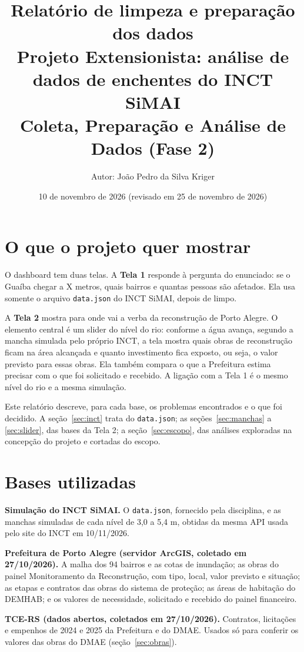 \documentclass[11pt,a4paper]{article}
\title{\textbf{Relatório de limpeza e preparação dos dados}\\[0.3em]\large Projeto Extensionista: análise de dados de enchentes do INCT SiMAI\\Coleta, Preparação e Análise de Dados (Fase 2)}
\author{Autor: João Pedro da Silva Kriger}
\date{10 de novembro de 2026 (revisado em 25 de novembro de 2026)}
\newcommand{\campo}[1]{\texttt{#1}}
\begin{document}
\maketitle

\section{O que o projeto quer mostrar}

O dashboard tem duas telas. A \textbf{Tela 1} responde à pergunta do enunciado: se o Guaíba chegar a X metros, quais bairros e quantas pessoas são afetados. Ela usa somente o arquivo \campo{data.json} do INCT SiMAI, depois de limpo.

A \textbf{Tela 2} mostra para onde vai a verba da reconstrução de Porto Alegre. O elemento central é um slider do nível do rio: conforme a água avança, segundo a mancha simulada pelo próprio INCT, a tela mostra quais obras de reconstrução ficam na área alcançada e quanto investimento fica exposto, ou seja, o valor previsto para essas obras. Ela também compara o que a Prefeitura estima precisar com o que foi solicitado e recebido. A ligação com a Tela 1 é o mesmo nível do rio e a mesma simulação.

Este relatório descreve, para cada base, os problemas encontrados e o que foi decidido. A seção~\ref{sec:inct} trata do \campo{data.json}; as seções~\ref{sec:manchas} a \ref{sec:slider}, das bases da Tela 2; a seção~\ref{sec:escopo}, das análises exploradas na concepção do projeto e cortadas do escopo.

\section{Bases utilizadas}

\textbf{Simulação do INCT SiMAI.} O \campo{data.json}, fornecido pela disciplina, e as manchas simuladas de cada nível de 3,0 a 5,4 m, obtidas da mesma API usada pelo site do INCT em 10/11/2026.

\textbf{Prefeitura de Porto Alegre (servidor ArcGIS, coletado em 27/10/2026).} A malha dos 94 bairros e as cotas de inundação; as obras do painel Monitoramento da Reconstrução, com tipo, local, valor previsto e situação; as etapas e contratos das obras do sistema de proteção; as áreas de habitação do DEMHAB; e os valores de necessidade, solicitado e recebido do painel financeiro.

\textbf{TCE-RS (dados abertos, coletados em 27/10/2026).} Contratos, licitações e empenhos de 2024 e 2025 da Prefeitura e do DMAE. Usados só para conferir os valores das obras do DMAE (seção~\ref{sec:obras}).
\end{document}
